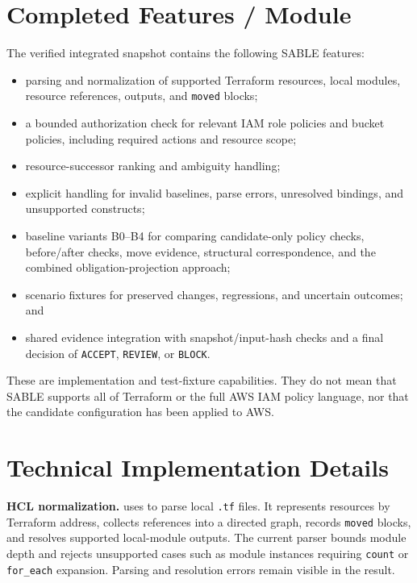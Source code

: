 \section{Completed Features / Module}

The verified integrated snapshot contains the following SABLE features:
\begin{itemize}
    \item parsing and normalization of supported Terraform resources, local modules, resource references, outputs, and \texttt{moved} blocks;
    \item a bounded authorization check for relevant IAM role policies and bucket policies, including required actions and resource scope;
    \item resource-successor ranking and ambiguity handling;
    \item explicit handling for invalid baselines, parse errors, unresolved bindings, and unsupported constructs;
    \item baseline variants B0--B4 for comparing candidate-only policy checks, before/after checks, move evidence, structural correspondence, and the combined obligation-projection approach;
    \item scenario fixtures for preserved changes, regressions, and uncertain outcomes; and
    \item shared evidence integration with snapshot/input-hash checks and a final decision of \texttt{ACCEPT}, \texttt{REVIEW}, or \texttt{BLOCK}.
\end{itemize}

These are implementation and test-fixture capabilities. They do not mean that SABLE supports all of Terraform or the full AWS IAM policy language, nor that the candidate configuration has been applied to AWS.

\section{Technical Implementation Details}

\textbf{HCL normalization.}  uses  to parse local \texttt{.tf} files. It represents resources by Terraform address, collects references into a directed graph, records \texttt{moved} blocks, and resolves supported local-module outputs. The current parser bounds module depth and rejects unsupported cases such as module instances requiring \texttt{count} or \texttt{for\_each} expansion. Parsing and resolution errors remain visible in the result.

